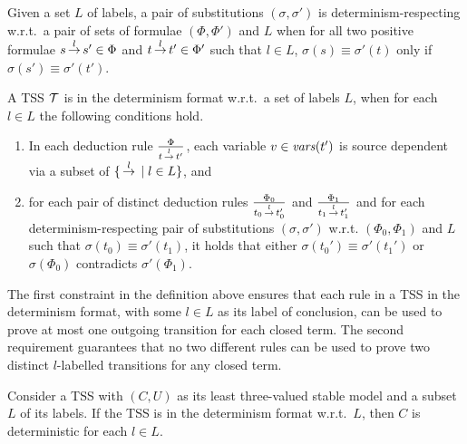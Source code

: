\begin{definition}
Given a set $L$ of labels, a pair of substitutions $(\sigma,\sigma')$ is determinism-respecting w.r.t.\
a pair of sets of formulae $(\Phi, \Phi')$ and $L$ when for all two positive formulae $s \,{\stackrel{{l}}{\rightarrow}}\, s' \in \Phi$ and $t \,{\stackrel{{l}}{\rightarrow}}\, t' \in \Phi'$ such that $l \in L$, $\sigma(s) \equiv \sigma'(t)$ only if  $\sigma(s') \equiv \sigma'(t')$.
\end{definition}


\begin{definition}
A TSS $\mathcal{T}$ is in the determinism format w.r.t.\ a set of labels $L$,
when for each $l \in L$ the following conditions hold.
\begin{enumerate}
    \item In each deduction rule $\frac{\Phi}{t\,{\stackrel{{l}}{\rightarrow}}\,t'}$, each variable $v\in \mathit{vars}(t')$ is source dependent
          via a subset of $\{ \,{\stackrel{{l}}{\rightarrow}}\, \mid l \in L\}$, and
    \item for each pair of distinct deduction rules $\frac{\Phi_0}{t_0\,{\stackrel{{l}}{\rightarrow}}\,t_0'}$ and $\frac{\Phi_1}{t_1\,{\stackrel{{l}}{\rightarrow}}\,t_1'}$ and
          for each determinism-respecting pair of substitutions $(\sigma, \sigma')$ w.r.t. $(\Phi_0, \Phi_1)$ and $L$
          such that $\sigma(t_0)\equiv\sigma'(t_1)$, it holds that
          either $\sigma(t_0')\equiv\sigma'(t_1')$ or $\sigma(\Phi_0)$ contradicts $\sigma'(\Phi_1)$.
\end{enumerate}
\end{definition}

The first constraint in the definition above ensures that each rule in a TSS
in the determinism format, with some $l \in L$ as its label of conclusion,
can be used to prove at most one outgoing transition for each closed term.
The second requirement guarantees that no two different rules can be used to prove two distinct
$l$-labelled transitions for any closed term.

\begin{theorem}\label{th::det}
Consider a TSS with $(C, U)$ as its least three-valued stable model and a subset $L$ of its labels. If the TSS is in the determinism format w.r.t.\ $L$, then $C$ is deterministic for each $l\in L$.
\end{theorem}

